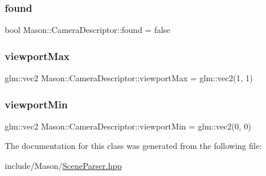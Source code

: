 \subsubsection{\texorpdfstring{found}{found}}
{\footnotesize\ttfamily bool Mason\+::\+Camera\+Descriptor\+::found = false}

\hypertarget{class_mason_1_1_camera_descriptor_ac0a5eb6054280925fbda6a20bb56932d}{}\label{class_mason_1_1_camera_descriptor_ac0a5eb6054280925fbda6a20bb56932d} 
\subsubsection{\texorpdfstring{viewport\+Max}{viewportMax}}
{\footnotesize\ttfamily glm\+::vec2 Mason\+::\+Camera\+Descriptor\+::viewport\+Max = glm\+::vec2(1, 1)}

\hypertarget{class_mason_1_1_camera_descriptor_a2d135d0102e435f15cf6a9dde7d64b25}{}\label{class_mason_1_1_camera_descriptor_a2d135d0102e435f15cf6a9dde7d64b25} 
\subsubsection{\texorpdfstring{viewport\+Min}{viewportMin}}
{\footnotesize\ttfamily glm\+::vec2 Mason\+::\+Camera\+Descriptor\+::viewport\+Min = glm\+::vec2(0, 0)}



The documentation for this class was generated from the following file\+:\begin{DoxyCompactItemize}
\item 
include/\+Mason/\hyperlink{_scene_parser_8hpp}{Scene\+Parser.\+hpp}\end{DoxyCompactItemize}
